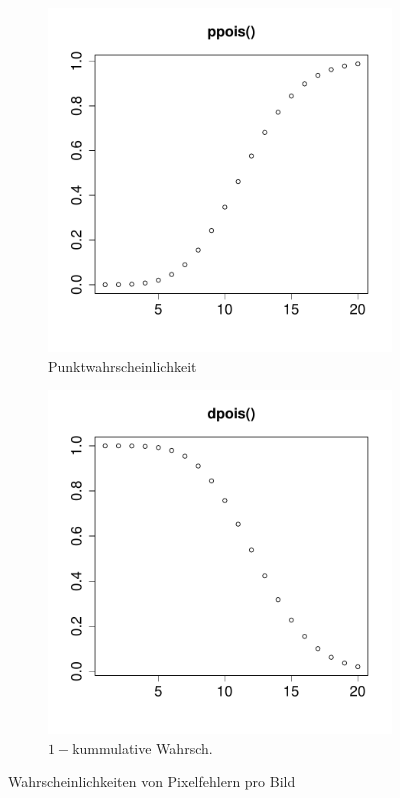 \begin{figure}[h!]
\centering
\begin{subfigure}[b]{0.48\textwidth}
\includegraphics{verteilungen-040}
\caption{Punktwahrscheinlichkeit}
\end{subfigure}
\begin{subfigure}[b]{0.48\textwidth}
\includegraphics{verteilungen-041}
\caption{$1-$kummulative Wahrsch.}
\end{subfigure}
\caption{Wahrscheinlichkeiten von Pixelfehlern pro Bild}
\label{fig:embedded}
\end{figure}


